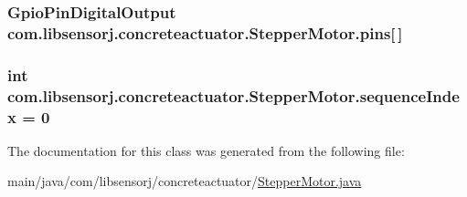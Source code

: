 \subsubsection[{pins}]{\setlength{\rightskip}{0pt plus 5cm}Gpio\+Pin\+Digital\+Output com.\+libsensorj.\+concreteactuator.\+Stepper\+Motor.\+pins\mbox{[}$\,$\mbox{]}\hspace{0.3cm}{\ttfamily [private]}}\label{classcom_1_1libsensorj_1_1concreteactuator_1_1StepperMotor_aefca907f907fd398b7bcdd902e04b928}
\hypertarget{classcom_1_1libsensorj_1_1concreteactuator_1_1StepperMotor_adc7f82436f61b2a32539f5af34b1c681}{}
\subsubsection[{sequence\+Index}]{\setlength{\rightskip}{0pt plus 5cm}int com.\+libsensorj.\+concreteactuator.\+Stepper\+Motor.\+sequence\+Index = 0\hspace{0.3cm}{\ttfamily [private]}}\label{classcom_1_1libsensorj_1_1concreteactuator_1_1StepperMotor_adc7f82436f61b2a32539f5af34b1c681}


The documentation for this class was generated from the following file\+:\begin{DoxyCompactItemize}
\item 
main/java/com/libsensorj/concreteactuator/\hyperlink{StepperMotor_8java}{Stepper\+Motor.\+java}\end{DoxyCompactItemize}
